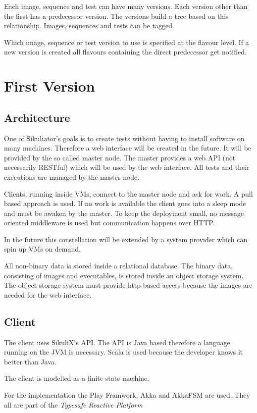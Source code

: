 \documentclass[a4paper,twocolumn]{article}
\begin{document}
Each image, sequence and test can have many versions.
Each version other than the first has a predecessor version.
The versions build a tree based on this relationship.
Images, sequences and tests can be tagged.

Which image, sequence or test version to use is specified at the flavour level.
If a new version is created all flavours containing the direct predecessor get notified.

\section{First Version}
\subsection{Architecture}
One of Sikuliator's goals is to create tests without having to install software on many machines.
Therefore a web interface will be created in the future.
It will be provided by the so called master node.
The master provides a web API (not necessarily RESTful) which will be used by the web interface.
All tests and their executions are managed by the master node.

Clients, running inside VMs, connect to the master node and ask for work.
A pull based approach is used.
If no work is available the client goes into a sleep mode and must be awaken by the master.
To keep the deployment small, no message oriented middleware is used but communication happens over HTTP.

In the future this constellation will be extended by a system provider which can spin up VMs on demand.

All non-binary data is stored inside a relational database.
The binary data, consisting of images and executables, is stored inside an object storage system.
The object storage system must provide http based access because the images are needed for the web interface.

\subsection{Client}
The client uses SikuliX's API.
The API is Java based therefore a language running on the JVM is necessary.
Scala is used because the developer knows it better than Java.

The client is modelled as a finite state machine.

For the implementation the Play Framwork\cite{Play}, Akka\cite{Akka} and AkkaFSM\cite{AkkaFSM} are used.
They all are part of the \emph{Typesafe Reactive Platform}\cite{TypesafeRP}
\end{document}
